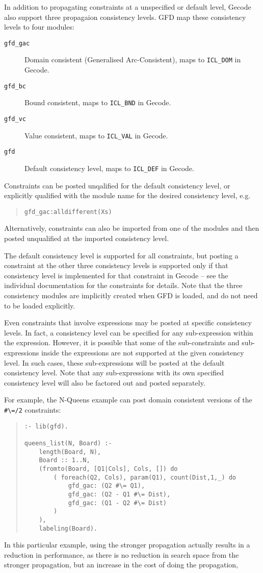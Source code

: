 \label{conlev}
In addition to propagating constraints at a unspecified or default level,
Gecode also support three propagaion consistency levels. GFD map
these consistency levels to four modules:
\begin{description}
\item[{\tt gfd_gac}] Domain consistent (Generalised Arc-Consistent), maps to {\tt ICL_DOM} in Gecode.
\item[{\tt gfd_bc}] Bound consistent, maps to {\tt ICL_BND} in Gecode.
\item[{\tt gfd_vc}] Value consistent, maps to {\tt ICL_VAL} in Gecode.
\item[{\tt gfd}] Default consistency level, maps to {\tt ICL_DEF} in Gecode.
\end{description}
Constraints can be posted unqalified for the default consistency level, or
explicitly qualified with the module name for the desired 
consistency level, e.g.
\begin{quote}
\begin{verbatim}
gfd_gac:alldifferent(Xs)
\end{verbatim}
\end{quote}
Alternatively, constraints can also be imported from one of the modules and 
then posted unqualified at the imported consistency level.

The default consistency level is supported for all constraints, but
posting a constraint at the other three consistency levels is supported only
if that consistency level is implemented for that constraint
in Gecode -- see the individual documentation for the constraints for details.
Note that the three consistency modules are implicitly created when GFD
is loaded, and do not need to be loaded explicitly. 

Even constraints that involve expressions may be posted at specific 
consistency levels. In fact, a consistency level can be specified for
any sub-expression within the expression. However, it is possible that some of
the sub-constraints and sub-expressions inside the expressions are not 
supported at the given consistency level. In such cases, these sub-expressions 
will be posted at the default consistency level. Note that any 
sub-expressions with its own specified consistency level will also be 
factored out and posted separately. 

For example, the N-Queens example
can post domain consistent versions of the \verb'#\=/2' constraints:
\begin{quote}
\begin{verbatim}
:- lib(gfd).

queens_list(N, Board) :-
    length(Board, N),
    Board :: 1..N,
    (fromto(Board, [Q1|Cols], Cols, []) do
        ( foreach(Q2, Cols), param(Q1), count(Dist,1,_) do
            gfd_gac: (Q2 #\= Q1),
            gfd_gac: (Q2 - Q1 #\= Dist),
            gfd_gac: (Q1 - Q2 #\= Dist)
        )
    ),
    labeling(Board).
\end{verbatim}
\end{quote}
In this particular example, using the stronger propagation actually results in
a reduction in performance, as there is no reduction in search space from the
stronger propagation, but an increase in the cost of doing the propagation, 

